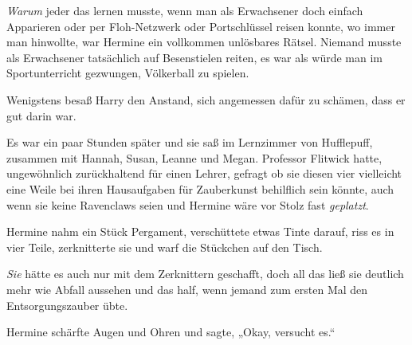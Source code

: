\emph{Warum} jeder das lernen musste, wenn man als Erwachsener doch einfach Apparieren oder per Floh-Netzwerk oder Portschlüssel reisen konnte, wo immer man hinwollte, war Hermine ein vollkommen unlösbares Rätsel. Niemand musste als Erwachsener tatsächlich auf Besenstielen reiten, es war als würde man im Sportunterricht gezwungen, Völkerball zu spielen.

Wenigstens besaß Harry den Anstand, sich angemessen dafür zu schämen, dass er gut darin war.

\later

Es war ein paar Stunden später und sie saß im Lernzimmer von Hufflepuff, zusammen mit Hannah, Susan, Leanne und Megan. Professor Flitwick hatte, ungewöhnlich zurückhaltend für einen Lehrer, gefragt ob sie diesen vier vielleicht eine Weile bei ihren Hausaufgaben für Zauberkunst behilflich sein könnte, auch wenn sie keine Ravenclaws seien und Hermine wäre vor Stolz fast \emph{geplatzt}.

Hermine nahm ein Stück Pergament, verschüttete etwas Tinte darauf, riss es in vier Teile, zerknitterte sie und warf die Stückchen auf den Tisch.

\emph{Sie} hätte es auch nur mit dem Zerknittern geschafft, doch all das ließ sie deutlich mehr wie Abfall aussehen und das half, wenn jemand zum ersten Mal den Entsorgungszauber übte.

Hermine schärfte Augen und Ohren und sagte, „Okay, versucht es.“

